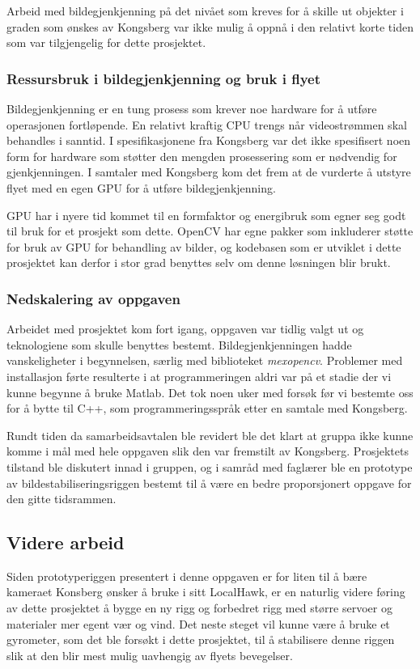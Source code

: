 Arbeid med bildegjenkjenning på det nivået som kreves for å skille ut objekter i graden som ønskes av Kongsberg var ikke mulig å oppnå i den relativt korte tiden som var tilgjengelig for dette prosjektet.


\subsubsection{Ressursbruk i bildegjenkjenning og bruk i flyet}

Bildegjenkjenning er en tung prosess som krever noe hardware for å utføre operasjonen fortløpende. En relativt kraftig CPU trengs når videostrømmen skal behandles i sanntid. I spesifikasjonene fra Kongsberg \cite{LocalHawkPDF} var det ikke spesifisert noen form for hardware som støtter den mengden prosessering som er nødvendig for gjenkjenningen. I samtaler med Kongsberg kom det frem at de vurderte å utstyre flyet med en egen GPU for å utføre bildegjenkjenning. 

GPU har i nyere tid kommet til en formfaktor og energibruk som egner seg godt til bruk for et prosjekt som dette. OpenCV har egne pakker som inkluderer støtte for bruk av GPU for behandling av bilder, og kodebasen som er utviklet i dette prosjektet kan derfor i stor grad benyttes selv om denne løsningen blir brukt.

\subsubsection{Nedskalering av oppgaven}
Arbeidet med prosjektet kom fort igang, oppgaven var tidlig valgt ut og teknologiene som skulle benyttes bestemt. Bildegjenkjenningen hadde vanskeligheter i begynnelsen, særlig med biblioteket \emph{mexopencv}. Problemer med installasjon førte resulterte i at programmeringen aldri var på et stadie der vi kunne begynne å bruke Matlab. Det tok noen uker med forsøk før vi bestemte oss for å bytte til C++, som programmeringsspråk etter en samtale med Kongsberg.

Rundt tiden da samarbeidsavtalen ble revidert ble det klart at gruppa ikke kunne komme i mål med hele oppgaven slik den var fremstilt av Kongsberg. Prosjektets tilstand ble diskutert innad i gruppen, og i samråd med faglærer ble en prototype av bildestabiliseringsriggen bestemt til å være en bedre proporsjonert oppgave for den gitte tidsrammen.

\subsection{Videre arbeid}
Siden prototyperiggen presentert i denne oppgaven er for liten til å bære kameraet Konsberg ønsker å bruke i sitt LocalHawk, er en naturlig videre føring av dette prosjektet å bygge en ny rigg og forbedret rigg med større servoer og materialer mer egent vær og vind. Det neste steget vil kunne være å bruke et gyrometer, som det ble forsøkt i dette prosjektet, til å stabilisere denne riggen slik at den blir mest mulig uavhengig av flyets bevegelser. 

